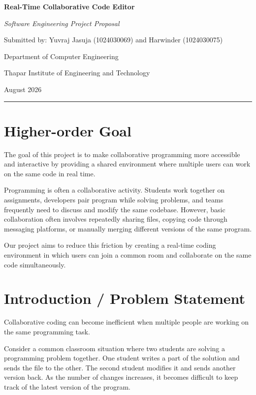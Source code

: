 \documentclass[11pt,letterpaper]{article}
\begin{document}
\begin{center}
{\LARGE\bfseries Real-Time Collaborative Code Editor}\par
\vspace{5pt}
{\large\itshape Software Engineering Project Proposal}\par
\vspace{10pt}
{\normalsize Submitted by: Yuvraj Jasuja (1024030069) and Harwinder (1024030075)}\par
{\normalsize Department of Computer Engineering}\par
{\normalsize Thapar Institute of Engineering and Technology}\par
{\normalsize August 2026}
\end{center}
\vspace{7pt}\hrule\vspace{5pt}

\section{Higher-order Goal}
The goal of this project is to make collaborative programming more accessible and interactive by providing a shared environment where multiple users can work on the same code in real time.

Programming is often a collaborative activity. Students work together on assignments, developers pair program while solving problems, and teams frequently need to discuss and modify the same codebase. However, basic collaboration often involves repeatedly sharing files, copying code through messaging platforms, or manually merging different versions of the same program.

Our project aims to reduce this friction by creating a real-time coding environment in which users can join a common room and collaborate on the same code simultaneously.

\section{Introduction / Problem Statement}
Collaborative coding can become inefficient when multiple people are working on the same programming task.

Consider a common classroom situation where two students are solving a programming problem together. One student writes a part of the solution and sends the file to the other. The second student modifies it and sends another version back. As the number of changes increases, it becomes difficult to keep track of the latest version of the program.
\end{document}
